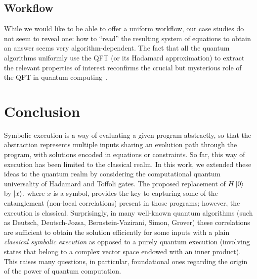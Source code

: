 \documentclass[sigplan,screen]{acmart}
\theoremstyle{definition}
\begin{document}
\subsection{Workflow}

While we would like to be able to offer a uniform workflow, our case
studies do not seem to reveal one: how to ``read'' the resulting
system of equations to obtain an answer seems very
algorithm-dependent. The fact that all the quantum algorithms
uniformly use the QFT (or its Hadamard approximation) to extract the
relevant properties of interest reconfirms the crucial but mysterious
role of the QFT in quantum
computing~\cite{PhysRevA.76.042321,qfft,Browne_2007,10.5555/2535639.2535646}.

\section{Conclusion}
\label{sec6}

Symbolic execution is a way of evaluating a given program abstractly,
so that the abstraction represents multiple inputs sharing an
evolution path through the program, with solutions encoded in
equations or constraints. So far, this way of execution has been
limited to the classical realm. In this work, we extended these ideas
to the quantum realm by considering the computational quantum
universality of Hadamard and Toffoli gates. The proposed replacement
of $H \ket{0}$ by $\ket{x}$, where $x$ is a symbol, provides the key
to capturing some of the entanglement (non-local correlations) present
in those programs; however, the execution is classical. Surprisingly,
in many well-known quantum algorithms (such as Deutsch, Deutsch-Jozsa,
Bernstein-Vazirani, Simon, Grover) these correlations are sufficient
to obtain the solution efficiently for some inputs with a plain
\emph{classical symbolic execution} as opposed to a purely quantum
execution (involving states that belong to a complex vector space
endowed with an inner product). This raises many questions, in
particular, foundational ones regarding the origin
of the power of quantum computation.



\end{document}
